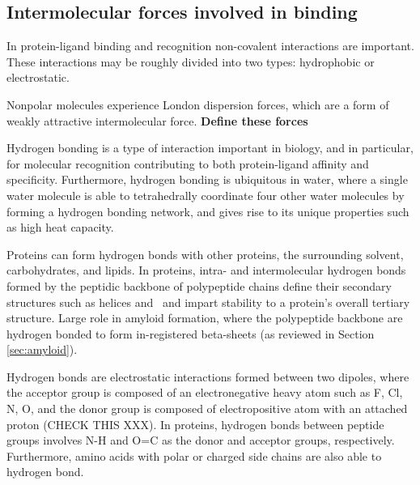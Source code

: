 \subsection{Intermolecular forces involved in binding}



In protein-ligand binding and recognition non-covalent interactions are important.  These interactions may be roughly divided into two types: hydrophobic or electrostatic.   

Nonpolar molecules experience London dispersion forces, which are a form of weakly attractive intermolecular force. \textbf{Define these forces}

Hydrogen bonding is a type of interaction important in biology, and in particular, for molecular recognition contributing to both protein-ligand affinity and specificity. Furthermore, hydrogen bonding is ubiquitous in water, where a single water molecule is able to tetrahedrally coordinate four other water molecules by forming a hydrogen bonding network, and gives rise to its unique properties such as high heat capacity.

Proteins can form hydrogen bonds with other proteins, the surrounding solvent, carbohydrates, and lipids. In proteins, intra- and intermolecular hydrogen bonds formed by the peptidic backbone of polypeptide chains define their secondary structures such as helices and \bsheets\, and impart stability to a protein's overall tertiary structure.\cite{refs}  Large role in amyloid formation, where the polypeptide backbone are hydrogen bonded to form in-registered beta-sheets (as reviewed in Section \ref{sec:amyloid}).

Hydrogen bonds are electrostatic interactions formed between two dipoles, where the acceptor group is composed of an electronegative heavy atom such as F, Cl, N, O, and the donor group is composed of electropositive atom with an attached proton (CHECK THIS XXX).  In proteins, hydrogen bonds between peptide groups involves N-H and O=C as the donor and acceptor groups, respectively. Furthermore, amino acids with polar or charged side chains are also able to hydrogen bond. 

